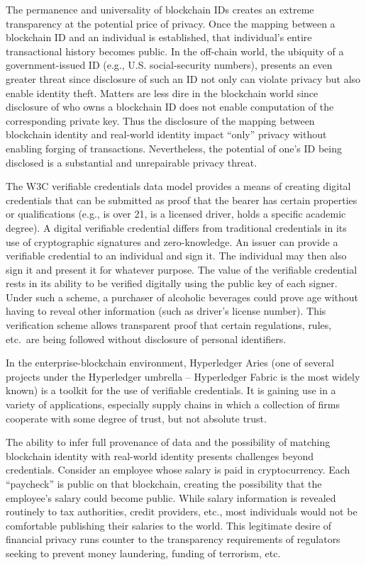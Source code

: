 \documentclass[11pt,dvipdfm]{article}
\begin{document}
The permanence and universality of blockchain IDs creates an extreme transparency at the potential price of privacy.
Once the mapping between a blockchain ID and an individual is established, that individual's entire
transactional history becomes public.
In the off-chain world, the ubiquity of a government-issued ID (e.g., U.S. social-security numbers),
presents an even greater threat since disclosure of such an ID not only can violate privacy but
also enable identity theft.  Matters are less dire in the blockchain world since disclosure of who owns
a blockchain ID does not enable computation of the corresponding private key.  Thus the
disclosure of the mapping between blockchain identity and real-world identity impact ``only''
privacy without enabling forging of transactions.
Nevertheless, the potential of one's ID being disclosed is a substantial and unrepairable privacy threat.

The W3C verifiable credentials data model\cite{w3c} provides a means of creating digital credentials that
can be submitted as proof that the bearer has certain properties or qualifications (e.g., is over 21,
is a licensed driver, holds a specific academic degree).
A digital verifiable credential differs from traditional credentials in its use of cryptographic signatures and
zero-knowledge.
An issuer can provide a verifiable credential to an individual and sign it. The individual may then also sign it and
present it for whatever purpose. The value of the verifiable credential rests in its ability to be verified digitally using
the public key of each signer.
Under such a scheme, a purchaser of alcoholic beverages could prove age without having to reveal 
other information (such as driver's license number).
This verification scheme allows transparent proof that certain regulations, rules, etc.\ are being followed without
disclosure of personal identifiers.

In the enterprise-blockchain environment, Hyperledger Aries (one of several projects under the Hyperledger 
umbrella -- Hyperledger Fabric is the most widely known) is a toolkit for the use of verifiable credentials.
It is gaining use in a variety of applications, especially supply chains in which a collection of firms 
cooperate with some degree of trust, but not absolute trust.

The ability to infer full provenance of data and the possibility of matching blockchain identity with real-world
identity presents challenges beyond credentials. Consider an employee whose salary is paid in cryptocurrency.
Each ``paycheck'' is public on that blockchain, creating the possibility that the employee's salary could 
become public.  While salary information is revealed routinely to tax authorities, credit providers, etc., most
individuals would not be comfortable publishing their salaries to the world.
This legitimate desire of financial privacy runs counter to the transparency requirements of regulators
seeking to prevent money laundering, funding of terrorism, etc.  
\end{document}
